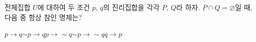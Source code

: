 전체집합 $U$에 대하여 두 조건 $p$, $q$의 진리집합을 각각 $P$, $Q$라 하자. $P\cap Q=\varnothing$일 때, 다음 중 항상 참인 명제는?
\begin{choices32}{$p\longrightarrow q$}{$\sim p\longrightarrow q$}{$p\longrightarrow \sim q$}{$\sim p\longrightarrow \sim q$}{$q\longrightarrow p$}\end{choices32}
